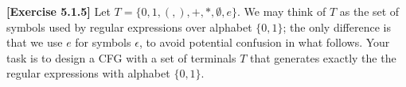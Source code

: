 \textbf{[Exercise 5.1.5]} Let $T = \{0,1,(,),+,*,\emptyset,e\}$. We may
think of $T$ as the set of symbols used by regular expressions over
alphabet $\{0,1\}$; the only difference is that we use $e$ for symbols
$\epsilon$, to avoid potential confusion in what follows. Your task is 
to design a CFG with a set of terminals $T$ that generates exactly the
the regular expressions with alphabet $\{0,1\}$.
